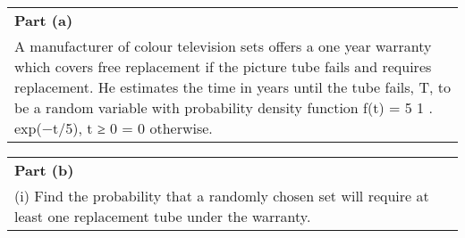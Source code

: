 \documentclass[a4paper,12pt]{article}
\begin{document}
\begin{table}[ht!]
\centering
 \begin{tabular}{|p{15cm}|}
 \hline        
 \noindent \textbf{Part (a)}\\
\noindent
A manufacturer of colour television sets offers a one year warranty which covers free replacement if the picture tube fails and requires replacement.  He estimates the time in years until the tube fails, T, to be a random variable with probability density function
f(t) = 
5 1
. exp(−t/5), t ≥ 0
      = 0     otherwise.

\\ \hline
 \end{tabular}
\end{table}

\begin{table}[ht!]
     \centering
     \begin{tabular}{|p{15cm}|}
     \hline        
 \noindent \textbf{Part (b)}\\
\noindent       
(i) Find the probability that a randomly chosen set will require at least one replacement tube under the warranty.

\\ \hline
 \end{tabular}
\end{table}
\end{document}
